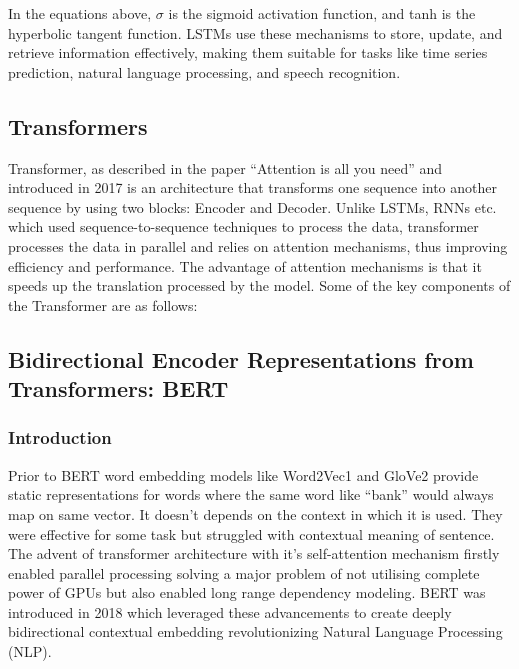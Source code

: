 \documentclass{article}
\begin{document}
In the equations above, $\sigma$ is the sigmoid activation function, and tanh is the hyperbolic tangent function. LSTMs use these mechanisms to store, update, and retrieve information effectively, making them suitable for tasks like time series prediction, natural language processing, and speech recognition.

\subsection{Transformers}
Transformer, as described in the paper “Attention is all you need” and introduced in 2017 is an architecture that transforms one sequence into another sequence by using two blocks: Encoder and Decoder. Unlike LSTMs, RNNs etc. which used sequence-to-sequence techniques to process the data, transformer processes the data in parallel and relies on attention mechanisms, thus improving efficiency and performance. The advantage of attention mechanisms is that it speeds up the translation processed by the model. Some of the key components of the Transformer are as follows:
\subsubsection{}
\subsection{Bidirectional Encoder Representations from Transformers: BERT}
\subsubsection{Introduction}
Prior to BERT word embedding models like Word2Vec1 and GloVe2 provide static representations 
for words where the same word like “bank” would always map on same vector. It doesn't depends 
on the context in which it is used. They were effective for some task but struggled with contextual 
meaning of sentence. The advent of transformer architecture with it's self-attention mechanism 
firstly enabled parallel processing solving a major problem of not utilising complete power of GPUs 
but also enabled long range dependency modeling. BERT was introduced in 2018 which leveraged 
these advancements to create deeply bidirectional contextual embedding revolutionizing Natural 
Language Processing (NLP).
\end{document}
